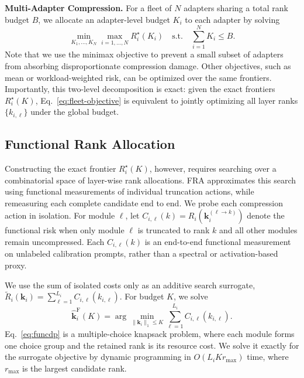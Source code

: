 \documentclass{article}
\begin{document}
\textbf{Multi-Adapter Compression.}
For a fleet of $N$ adapters sharing a total rank budget $B$, we allocate an
adapter-level budget $K_i$ to each adapter by solving
\begin{equation}
	\min_{K_1,\ldots,K_N}
	\max_{i=1,\ldots,N} R_i^\star(K_i)
	\quad
	\mathrm{s.t.}\quad
	\sum_{i=1}^{N}K_i\le B.
	\label{eq:fleet-objective}
\end{equation}
Note that we use the minimax objective to prevent a small subset of adapters from
absorbing disproportionate compression damage. Other objectives, such as mean
or workload-weighted risk, can be optimized over the same frontiers. Importantly, this two-level decomposition is exact: given the exact frontiers $R_i^\star(K)$, Eq.~\eqref{eq:fleet-objective} is equivalent to
jointly optimizing all layer ranks $\{k_{i,\ell}\}$ under the global budget.

\subsection{Functional Rank Allocation}
\label{sec:functional-rank-allocation}

Constructing the exact frontier $R_i^\star(K)$, however, requires searching
over a combinatorial space of layer-wise rank allocations. FRA approximates
this search using functional measurements of individual truncation actions,
while remeasuring each complete candidate end to end. We probe each compression
action in isolation. For
module $\ell$, let $  C_{i,\ell}(k)
  =R_i\!\left(\mathbf{k}_i^{(\ell\rightarrow k)}\right)
  \label{eq:isolated-cost} $
denote the functional risk when only module $\ell$ is truncated to rank $k$
and all other modules remain uncompressed. Each $C_{i,\ell}(k)$ is an
end-to-end functional measurement on unlabeled calibration prompts, rather
than a spectral or activation-based proxy.

We use the sum of isolated costs only as an additive search surrogate,
$\widetilde R_i(\mathbf{k}_i)=\sum_{\ell=1}^{L_i}
C_{i,\ell}(k_{i,\ell})$. For budget $K$, we solve
\begin{equation}
  \widehat{\mathbf{k}}_i^{\mathrm F}(K)
  =\arg\min_{\|\mathbf{k}_i\|_1\le K}
  \sum_{\ell=1}^{L_i}C_{i,\ell}(k_{i,\ell}).
  \label{eq:funcdp}
\end{equation}
Eq.~\eqref{eq:funcdp} is a multiple-choice knapsack problem, where each
module forms one choice group and the retained rank is its resource cost.
We solve it exactly for the surrogate objective by dynamic programming in
$O(L_i K r_{\max})$ time, where $r_{\max}$ is the largest candidate rank.
\end{document}
